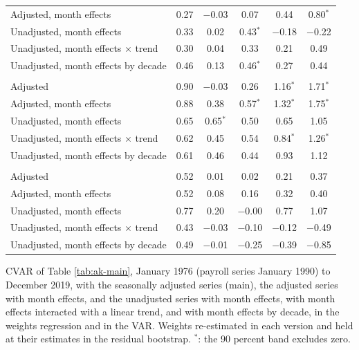 \begin{table}[htbp]
\begin{tabular}{lccccc}
Adjusted, month effects & 0.27 & $-$0.03 & 0.07 & 0.44 & 0.80$^{*}$ \\
Unadjusted, month effects & 0.33 & 0.02 & 0.43$^{*}$ & $-$0.18 & $-$0.22 \\
Unadjusted, month effects $\times$ trend & 0.30 & 0.04 & 0.33 & 0.21 & 0.49 \\
Unadjusted, month effects by decade & 0.46 & 0.13 & 0.46$^{*}$ & 0.27 & 0.44 \\
\addlinespace
\multicolumn{6}{l}{Leisure and hospitality} \\
Adjusted & 0.90 & $-$0.03 & 0.26 & 1.16$^{*}$ & 1.71$^{*}$ \\
Adjusted, month effects & 0.88 & 0.38 & 0.57$^{*}$ & 1.32$^{*}$ & 1.75$^{*}$ \\
Unadjusted, month effects & 0.65 & 0.65$^{*}$ & 0.50 & 0.65 & 1.05 \\
Unadjusted, month effects $\times$ trend & 0.62 & 0.45 & 0.54 & 0.84$^{*}$ & 1.26$^{*}$ \\
Unadjusted, month effects by decade & 0.61 & 0.46 & 0.44 & 0.93 & 1.12 \\
\addlinespace
\multicolumn{6}{l}{Retail trade} \\
Adjusted & 0.52 & 0.01 & 0.02 & 0.21 & 0.37 \\
Adjusted, month effects & 0.52 & 0.08 & 0.16 & 0.32 & 0.40 \\
Unadjusted, month effects & 0.77 & 0.20 & $-$0.00 & 0.77 & 1.07 \\
Unadjusted, month effects $\times$ trend & 0.43 & $-$0.03 & $-$0.10 & $-$0.12 & $-$0.49 \\
Unadjusted, month effects by decade & 0.49 & $-$0.01 & $-$0.25 & $-$0.39 & $-$0.85 \\
\bottomrule
\end{tabular}
\par\smallskip\parbox{0.95\textwidth}{\footnotesize CVAR of Table \ref{tab:ak-main}, January 1976 (payroll series January 1990) to December 2019, with the seasonally adjusted series (main), the adjusted series with month effects, and the unadjusted series with month effects, with month effects interacted with a linear trend, and with month effects by decade, in the weights regression and in the VAR. Weights re-estimated in each version and held at their estimates in the residual bootstrap. $^{*}$: the 90 percent band excludes zero.}
\end{table}
